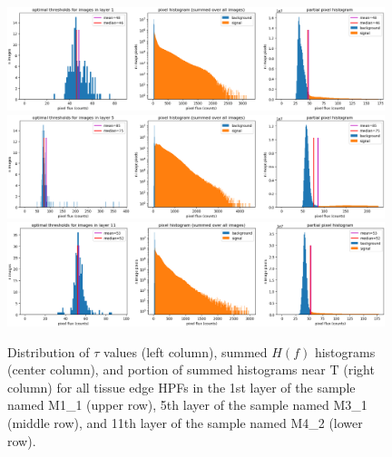 \documentclass[letterpaper,11pt]{article}
\newcommand{\Tau}{\mathrm{T}}
\begin{document}
\begin{figure}[!ht]
\centering
\includegraphics[width=0.98\textwidth]{images/masking/M1_1_layer_1_background_threshold_plots}
\includegraphics[width=0.98\textwidth]{images/masking/M3_1_layer_5_background_threshold_plots}
\includegraphics[width=0.98\textwidth]{images/masking/M4_2_layer_11_background_threshold_plots}
\caption{\footnotesize Distribution of $\tau$ values (left column), summed $H(f)$ histograms (center column), and portion of summed histograms near $\Tau$ (right column) for all tissue edge HPFs in the 1st layer of the sample named M1\_1 (upper row), 5th layer of the sample named M3\_1 (middle row), and 11th layer of the sample named M4\_2 (lower row).}
\label{fig:threshold_distributions_1}
\end{figure}
\end{document}
